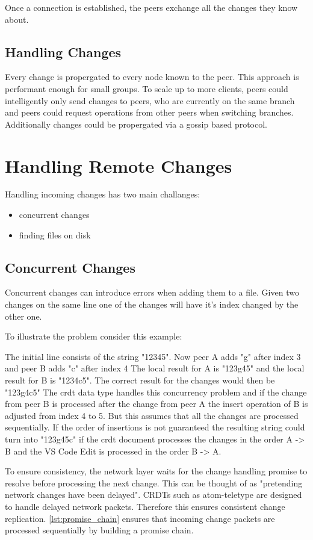 Once a connection is established, the peers exchange all the changes they know about.

\subsection{Handling Changes}
Every change is propergated to every node known to the peer. This approach is performant enough for small groups. To scale up to more clients, peers could intelligently only send changes to peers, who are currently on the same branch and peers could request operations from other peers when switching branches. Additionally changes could be propergated via a gossip based protocol.

\section{Handling Remote Changes}

Handling incoming changes has two main challanges:
\begin{itemize}
    \item concurrent changes
    \item finding files on disk
\end{itemize}

\subsection{Concurrent Changes}
\label{subsec:concurrentchanges}
Concurrent changes can introduce errors when adding them to a file. 
Given two changes on the same line one of the changes will have it's index changed by the other one.

To illustrate the problem consider this example:

The initial line consists of the string "12345".
Now peer A adds "g" after index 3 and peer B adds "c" after index 4
The local result for A is "123g45" and the local result for B is "1234c5".
The correct result for the changes would then be "123g4c5"
The crdt data type handles this concurrency problem and if the change from peer B is processed after the change from peer A the insert operation of B is adjusted from index 4 to 5.
But this assumes that all the changes are processed sequentially. If the order of insertions is not guaranteed the resulting string could turn into "123g45c" if the crdt document processes the changes in the order A -> B and the VS Code Edit is processed in the order B -> A.

To ensure consistency, the network layer waits for the change handling promise to resolve before processing the next change. This can be thought of as "pretending network changes have been delayed".
CRDTs such as atom-teletype are designed to handle delayed network packets. Therefore this ensures consistent change replication. \autoref{lst:promise_chain} ensures that incoming change packets are processed sequentially by building a promise chain.

